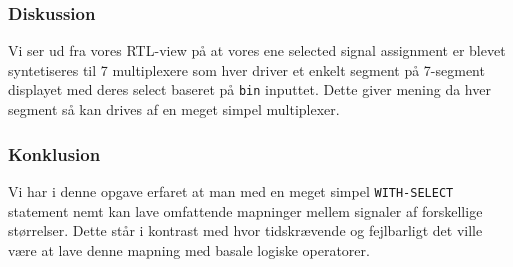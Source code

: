 {  

  \subsubsection{Diskussion}

  Vi ser ud fra vores RTL-view på  at vores ene selected signal assignment er blevet syntetiseres til 7 multiplexere som hver driver et enkelt segment på 7-segment displayet med deres select baseret på \texttt{bin} inputtet. Dette giver mening da hver segment så kan drives af en meget simpel multiplexer.

  \subsubsection{Konklusion}

  Vi har i denne opgave erfaret at man med en meget simpel \texttt{WITH-SELECT} statement nemt kan lave omfattende mapninger mellem signaler af forskellige størrelser. Dette står i kontrast med hvor tidskrævende og fejlbarligt det ville være at lave denne mapning med basale logiske operatorer.
}